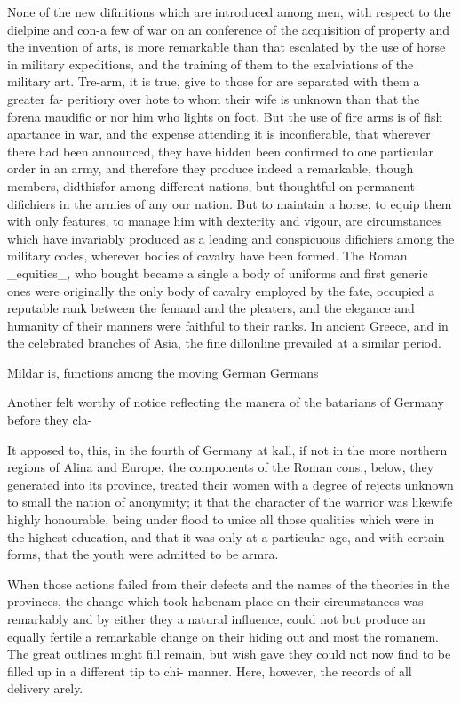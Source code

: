 \documentclass{article}
\begin{document}
None of the new difinitions which are introduced among men, with respect to the dielpine and con-a few of war on an conference of the acquisition of property and the invention of arts, is more remarkable than that escalated by the use of horse in military expeditions, and the training of them to the exalviations of the military art. Tre-arm, it is true, give to those for are separated with them a greater fa- peritiory over hote to whom their wife is unknown than that the forena maudific or nor him who lights on foot. But the use of fire arms is of fish apartance in war, and the expense attending it is inconfierable, that wherever there had been announced, they have hidden been confirmed to one particular order in an army, and therefore they produce indeed a remarkable, though members, didthisfor among different nations, but thoughtful on permanent difichiers in the armies of any our nation. But to maintain a horse, to equip them with only features, to manage him with dexterity and vigour, are circumstances which have invariably produced as a leading and conspicuous difichiers among the military codes, wherever bodies of cavalry have been formed. The Roman \_equities\_, who bought became a single a body of uniforms and first generic ones were originally the only body of cavalry employed by the fate, occupied a reputable rank between the femand and the pleaters, and the elegance and humanity of their manners were faithful to their ranks. In ancient Greece, and in the celebrated branches of Asia, the fine dillonline prevailed at a similar period.

Mildar is, functions among the moving German Germans

Another felt worthy of notice reflecting the manera of the batarians of Germany before they cla-

It apposed to, this, in the fourth of Germany at kall, if not in the more northern regions of Alina and Europe, the components of the Roman cons., below, they generated into its province, treated their women with a degree of rejects unknown to small the nation of anonymity; it that the character of the warrior was likewife highly honourable, being under flood to unice all those qualities which were in the highest education, and that it was only at a particular age, and with certain forms, that the youth were admitted to be armra.

When those actions failed from their defects and the names of the theories in the provinces, the change which took habenam place on their circumstances was remarkably and by either they a natural influence, could not but produce an equally fertile a remarkable change on their hiding out and most the romanem. The great outlines might fill remain, but wish gave they could not now find to be filled up in a different tip to chi- manner. Here, however, the records of all delivery arely.
\end{document}
